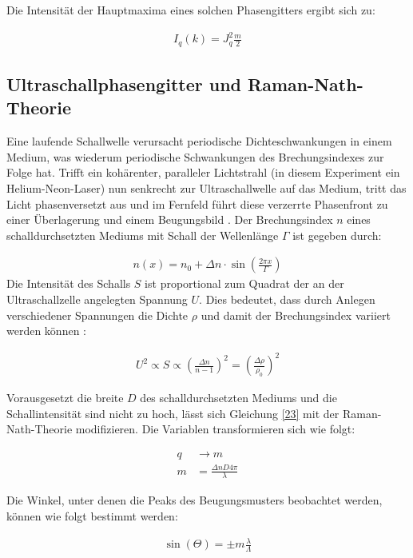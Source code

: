 \documentclass[12pt]{article}
\begin{document}
Die Intensität der Hauptmaxima eines solchen Phasengitters ergibt sich zu:

\begin{align} \label{23}
I_q \left(k \right) = J_q ^2\frac{m}{2}
\end{align}
\subsection{Ultraschallphasengitter und Raman-Nath-Theorie}
\label{Raman-Nath}

Eine laufende Schallwelle verursacht periodische Dichteschwankungen in einem Medium, was wiederum periodische Schwankungen des Brechungsindexes zur Folge hat. Trifft ein kohärenter, paralleler Lichtstrahl (in diesem Experiment ein Helium-Neon-Laser) nun senkrecht zur Ultraschallwelle auf das Medium, tritt das Licht phasenversetzt aus und im Fernfeld führt diese verzerrte Phasenfront zu einer Überlagerung und einem Beugungsbild \cite{anleitung}. Der Brechungsindex $n$ eines schalldurchsetzten Mediums mit Schall der Wellenlänge $\Gamma$ ist gegeben durch:

\begin{align}
n\left(x \right) = n_0 + \Delta n \cdot \sin \left(\frac{2 \pi x}{\Gamma} \right) 
\end{align}
Die Intensität des Schalls $S$ ist proportional zum Quadrat der an der Ultraschallzelle angelegten Spannung $ U$. Dies bedeutet, dass durch Anlegen verschiedener Spannungen die Dichte $\rho$ und damit der Brechungsindex variiert werden können \cite{anleitung}:

\begin{align}
U^2 \propto S \propto \left( \frac{\Delta n}{n -1} \right)^2 = \left( \frac{\Delta \rho}{\rho_0}\right)^2  
\end{align}

Vorausgesetzt die breite $D$ des schalldurchsetzten Mediums und die Schallintensität sind nicht zu hoch, lässt sich Gleichung \ref{23} mit der Raman-Nath-Theorie modifizieren. Die Variablen transformieren sich wie folgt:

\begin{align}
q &\rightarrow m\\
m &= \frac{\Delta n D 4 \pi}{\lambda}
\end{align}

Die Winkel, unter denen die Peaks des Beugungsmusters beobachtet werden, können wie folgt bestimmt werden:

\begin{align}
\sin\left( \Theta\right) = \pm m \frac{\lambda}{\Lambda}
\end{align}
\end{document}
